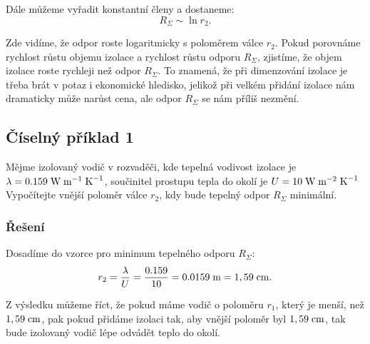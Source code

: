 \documentclass{article}
\begin{document}
Dále můžeme vyřadit konstantní členy a dostaneme:
$$
    R_\Sigma \sim \ln r_2.
$$

Zde vidíme, že odpor roste logaritmicky s poloměrem válce $r_2$. Pokud porovnáme rychlost růstu objemu izolace a rychlost růstu odporu $R_\Sigma$, zjistíme, že objem izolace roste rychleji než odpor $R_\Sigma$. To znamená, že při dimenzování izolace je třeba brát v potaz i ekonomické hledisko, jelikož při velkém přidání izolace nám dramaticky může narůst cena, ale odpor $R_\Sigma$ se nám příliš nezmění.

\begin{center}
\end{center}


\subsection{Číselný příklad 1 \spicy \spicy}
Mějme izolovaný vodič v rozvaděči, kde tepelná vodivost izolace je $\lambda = 0.159 \; \textrm{W} \; \textrm{m}^{-1} \; \textrm{K}^{-1}$, součinitel prostupu tepla do okolí je $U = 10 \; \textrm{W} \; \textrm{m}^{-2} \; \textrm{K}^{-1}$ Vypočítejte vnější poloměr válce $r_2$, kdy bude tepelný odpor $R_\Sigma$ minimální.

\subsubsection{Řešení}
Dosadíme do vzorce pro minimum tepelného odporu $R_\Sigma$:
$$
    r_2 = \frac{\lambda}{U} = \frac{0.159}{10} = 0.0159 \; \textrm{m} = 1,59 \; \textrm{cm}.
$$

Z výsledku můžeme říct, že pokud máme vodič o poloměru $r_1$, který je menší, než $1,59 \; \textrm{cm}$, pak pokud přidáme izolaci tak, aby vnější poloměr byl $1,59 \; \textrm{cm}$, tak bude izolovaný vodič lépe odvádět teplo do okolí.
\end{document}
